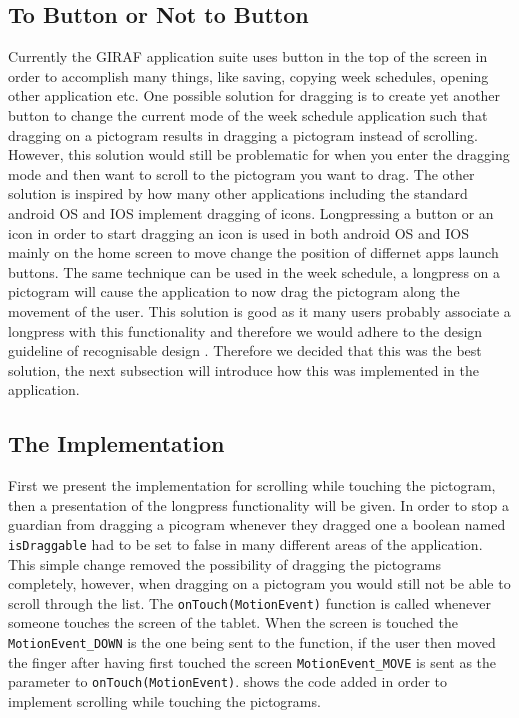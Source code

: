 \subsection*{To Button or Not to Button}
Currently the GIRAF application suite uses button in the top of the screen in order to accomplish many things, like saving, copying week schedules, opening other application etc. 
One possible solution for dragging is to create yet another button to change the current mode of the week schedule application such that dragging on a pictogram results in dragging a pictogram instead of scrolling.
However, this solution would still be problematic for when you enter the dragging mode and then want to scroll to the pictogram you want to drag.
The other solution is inspired by how many other applications including the standard android OS and IOS implement dragging of icons.
Longpressing a button or an icon in order to start dragging an icon is used in both android OS and IOS mainly on the home screen to move change the position of differnet apps launch buttons.
The same technique can be used in the week schedule, a longpress on a pictogram will cause the application to now drag the pictogram along the movement of the user.
This solution is good as it many users probably associate a longpress with this functionality and therefore we would adhere to the design guideline of recognisable design \cite[p.~51]{DESIGNBOOK}.
Therefore we decided that this was the best solution, the next subsection will introduce how this was implemented in the application.

\subsection*{The Implementation}
First we present the implementation for scrolling while touching the pictogram, then a presentation of the longpress functionality will be given.
In order to stop a guardian from dragging a picogram whenever they dragged one a boolean named \texttt{isDraggable} had to be set to false in many different areas of the application.
This simple change removed the possibility of dragging the pictograms completely, however, when dragging on a pictogram you would still not be able to scroll through the list.
The \texttt{onTouch(MotionEvent)} function is called whenever someone touches the screen of the tablet.
When the screen is touched the \texttt{MotionEvent\_DOWN} is the one being sent to the function, if the user then moved the finger after having first touched the screen \texttt{MotionEvent\_MOVE} is sent as the parameter to \texttt{onTouch(MotionEvent)}.
 shows the code added in order to implement scrolling while touching the pictograms.

